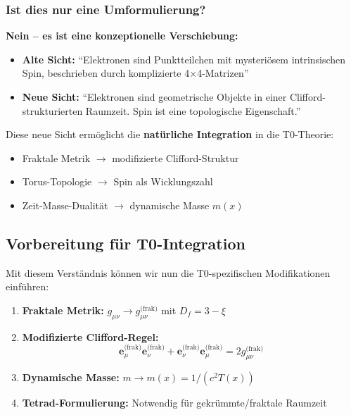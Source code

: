 \subsubsection{Ist dies nur eine Umformulierung?}

\textbf{Nein -- es ist eine konzeptionelle Verschiebung:}

\begin{itemize}
	\item \textbf{Alte Sicht:} ``Elektronen sind Punktteilchen mit mysteriösem 
	intrinsischen Spin, beschrieben durch komplizierte 4×4-Matrizen''
	
	\item \textbf{Neue Sicht:} ``Elektronen sind geometrische Objekte in einer 
	Clifford-strukturierten Raumzeit. Spin ist eine topologische Eigenschaft.''
\end{itemize}

Diese neue Sicht ermöglicht die \textbf{natürliche Integration} in die T0-Theorie:
\begin{itemize}
	\item Fraktale Metrik $\rightarrow$ modifizierte Clifford-Struktur
	\item Torus-Topologie $\rightarrow$ Spin als Wicklungszahl
	\item Zeit-Masse-Dualität $\rightarrow$ dynamische Masse $m(x)$
\end{itemize}

\subsection{Vorbereitung für T0-Integration}
\label{subsec:preparation_t0}

Mit diesem Verständnis können wir nun die T0-spezifischen Modifikationen einführen:

\begin{enumerate}
	\item \textbf{Fraktale Metrik:} $g_{\mu\nu} \rightarrow g_{\mu\nu}^{\text{(frak)}}$ 
	mit $D_f = 3 - \xi$
	
	\item \textbf{Modifizierte Clifford-Regel:}
	\begin{equation}
		\mathbf{e}_\mu^{\text{(frak)}} \mathbf{e}_\nu^{\text{(frak)}} + 
		\mathbf{e}_\nu^{\text{(frak)}} \mathbf{e}_\mu^{\text{(frak)}} = 
		2 g_{\mu\nu}^{\text{(frak)}}
	\end{equation}
	
	\item \textbf{Dynamische Masse:} $m \rightarrow m(x) = 1/(c^2 T(x))$
	
	\item \textbf{Tetrad-Formulierung:} Notwendig für gekrümmte/fraktale Raumzeit
\end{enumerate}

